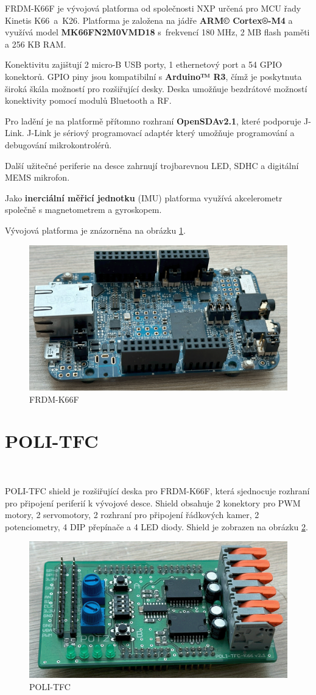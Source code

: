 FRDM-K66F je vývojová platforma od společnosti NXP určená pro MCU řady Kinetis K66~a~K26.
Platforma je založena na jádře \textbf{ARM© Cortex®-M4} a využívá model \textbf{MK66FN2M0VMD18} s~frekvencí 180 MHz, 2 MB flash paměti a 256 KB RAM.

Konektivitu zajištují 2 micro-B USB porty, 1 ethernetový port a 54 GPIO konektorů.
GPIO piny jsou kompatibilní s \textbf{Arduino™ R3}, čímž je
poskytnuta široká škála možností pro rozšiřující desky.
Deska umožňuje bezdrátové možností konektivity pomocí
modulů Bluetooth a RF.

Pro ladění je na platformě přítomno rozhraní \textbf{OpenSDAv2.1}, které podporuje J-Link. J-Link je sériový programovací adaptér
který umožňuje programování a debugování mikrokontrolérů.

Další užitečné periferie na desce zahrnují trojbarevnou LED, SDHC a digitální MEMS mikrofon.

Jako \textbf{inerciální měřicí jednotku} (IMU) platforma využívá akcelerometr společně s magnetometrem a gyroskopem\cite{frdmk66UserGuide}.

Vývojová platforma je znázorněna na obrázku \ref{fig:FRDM-K66F}.
\begin{figure}[!h]
    \centering
    \includegraphics[width = .5\linewidth]{Figures/FRDM-K66F.png}
    \caption{FRDM-K66F}
    \label{fig:FRDM-K66F}
    \vspace{-20pt}
\end{figure}

\section{POLI-TFC}
\label{sec:POLI-TFC}\

POLI-TFC shield je rozšiřující deska pro FRDM-K66F, která sjednocuje rozhraní pro
připojení periferií k vývojové desce. Shield obsahuje 2 konektory pro PWM motory,
2 servomotory, 2 rozhraní pro připojení řádkových kamer,
2 potenciometry, 4 DIP přepínače a 4 LED diody.
Shield je zobrazen na obrázku \ref{fig:POLI-TFC}.
\begin{figure}[!h]
    \centering
    \includegraphics[width = .4\linewidth]{Figures/POLI-TFC.png}
    \caption{POLI-TFC}
    \label{fig:POLI-TFC}
    \vspace{-15pt}
\end{figure}
